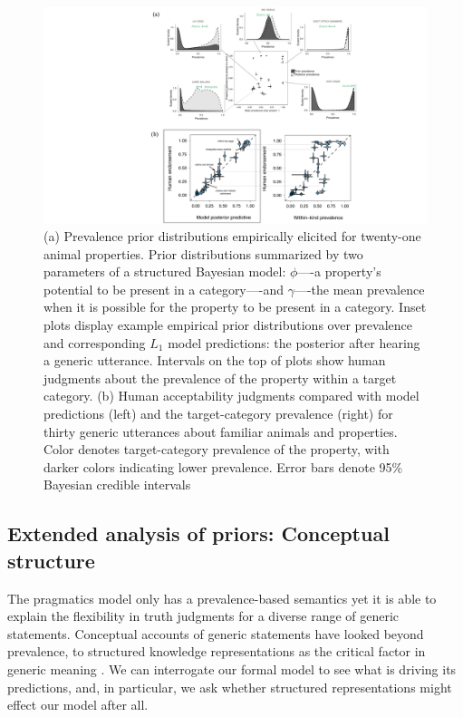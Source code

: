 \documentclass[12pt,letterpaper]{article}
\begin{document}
\begin{figure}
\centering
    \includegraphics[width=\columnwidth]{generics-prior-prevalence-tj.pdf}
    \caption{(a) 
    Prevalence prior distributions empirically elicited for twenty-one animal properties.
    Prior distributions summarized by two parameters of a structured Bayesian model: $\phi$----a property's potential to be present in a category----and $\gamma$----the mean prevalence when it is possible for the property to be present in a category.
    Inset plots display example empirical prior distributions over prevalence and corresponding $L_1$ model predictions: the posterior after hearing a generic utterance. 
    Intervals on the top of plots show human judgments about the prevalence of the property within a target category.
    (b)
    Human acceptability judgments compared with model predictions (left) and the target-category prevalence (right) for thirty generic utterances about familiar animals and properties. 
    Color denotes target-category prevalence of the property, with darker colors indicating lower prevalence. 
     Error bars denote 95\% Bayesian credible intervals
    }
  \label{fig:commongenerics}

\end{figure}



\subsection*{Extended analysis of priors: Conceptual structure}

The pragmatics model only has a prevalence-based semantics yet it is able to explain the flexibility in truth judgments for a diverse range of generic statements.
Conceptual accounts of generic statements have looked beyond prevalence, to structured knowledge representations as the critical factor in generic meaning \cite{Leslie2007, Prasada2013}. 
We can interrogate our formal model to see what is driving its predictions, and, in particular, we ask whether structured representations might effect our model after all.
\end{document}
